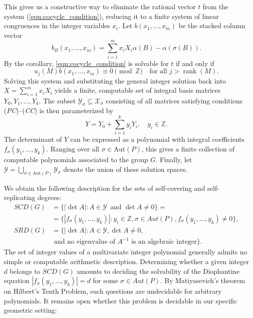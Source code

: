 \documentclass[draft]{adm-paper}
\theoremstyle{definition}
\begin{document}
This gives us a constructive way to eliminate the rational vector $t$ from the system (\ref{eqn:cocycle_condition}), reducing it to a finite system of linear congruences in the integer variables $x_i$. Let $b(x_1, \dots, x_m)$ be the stacked column vector
\[
b_B(x_1, \dots, x_m) = \sum_{i=1}^{m} x_i X_i \alpha(B) - \alpha(\sigma(B)).
\]
By the corollary, \eqref{eqn:cocycle_condition} is solvable for $t$ if and only if
\begin{equation}\label{eqn:small_cong_system}
u_j(M)b(x_1, \dots, x_m) \equiv 0 \pmod{\mathbb{Z}} \quad \text{for all } j > \operatorname{rank}(M).
\end{equation}
Solving this system and substituting the general integer solution back into $X = \sum_{i=1}^m x_i X_i$ yields a
finite, computable set of integral basis matrices $Y_0, Y_1, \dots, Y_k$. The subset $\mathcal{Y}_\sigma \subseteq
\mathcal{X}_\sigma$ consisting of all matrices satisfying conditions (\textit{PC})--(\textit{CC}) is then
parameterized by
\begin{equation}\label{eqn:Y_sum_Yi}
Y = Y_0 + \sum_{i=1}^{k} y_i Y_i, \quad y_i \in \mathbb{Z}.
\end{equation}
The determinant of $Y$ can be expressed as a polynomial with integral coefficients
$f_\sigma(y_1, \dots, y_k)$. Ranging over all $\sigma \in \mathrm{Aut}(P)$, this gives a finite collection of
computable polynomials associated to the group $G$. Finally, let $\mathcal{Y} = \bigcup_{\sigma \in \mathrm{Aut}(P)}
\mathcal{Y}_\sigma$ denote the union of these solution spaces.

We obtain the following description for the sets of self-covering and self-replicating degrees:
\begin{align*}
SCD(G)&=\{ |\det A| : A\in \mathcal{Y}\, \text{ and } \det A\neq 0 \}=\\
&=\{ |f_\sigma(y_1,\ldots, y_k)| : y_i\in\mathbb{Z}, \sigma\in Aut(P),
f_\sigma(y_1,\ldots, y_k) \neq 0 \},\\
SRD(G)&=\{ |\det A| : A\in \mathcal{Y}, \det A \neq 0, \\
      & \mbox{ and no eigenvalue of $A^{-1}$ is an algebraic integer}\}.
\end{align*}
The set of integer values of a multivariate integer polynomial generally admits no simple or computable arithmetic
description. Determining whether a given integer $d$ belongs to $SCD(G)$ amounts to deciding the solvability of the
Diophantine equation $|f_\sigma(y_1,\ldots, y_k)|=d$ for some $\sigma\in Aut(P)$. By Matiyasevich's theorem on
Hilbert's Tenth Problem, such questions are undecidable for arbitrary polynomials. It remains open whether this
problem is decidable in our specific geometric setting:
\end{document}
